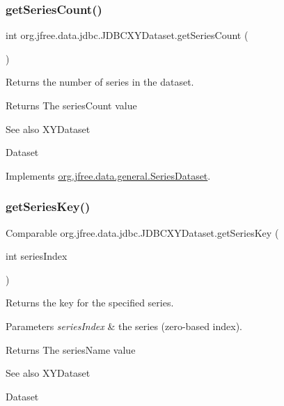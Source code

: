 \subsubsection{\texorpdfstring{get\+Series\+Count()}{getSeriesCount()}}
{\footnotesize\ttfamily int org.\+jfree.\+data.\+jdbc.\+J\+D\+B\+C\+X\+Y\+Dataset.\+get\+Series\+Count (\begin{DoxyParamCaption}{ }\end{DoxyParamCaption})}

Returns the number of series in the dataset.

\begin{DoxyReturn}{Returns}
The series\+Count value
\end{DoxyReturn}
\begin{DoxySeeAlso}{See also}
X\+Y\+Dataset 

Dataset 
\end{DoxySeeAlso}


Implements \mbox{\hyperlink{interfaceorg_1_1jfree_1_1data_1_1general_1_1_series_dataset_a84fe822f5918f941d9de1ed1b73c9f58}{org.\+jfree.\+data.\+general.\+Series\+Dataset}}.

\mbox{\label{classorg_1_1jfree_1_1data_1_1jdbc_1_1_j_d_b_c_x_y_dataset_a9e0357ec22ce7eeff36ff12c6cfd4d00}} 
\subsubsection{\texorpdfstring{get\+Series\+Key()}{getSeriesKey()}}
{\footnotesize\ttfamily Comparable org.\+jfree.\+data.\+jdbc.\+J\+D\+B\+C\+X\+Y\+Dataset.\+get\+Series\+Key (\begin{DoxyParamCaption}\item[{int}]{series\+Index }\end{DoxyParamCaption})}

Returns the key for the specified series.


\begin{DoxyParams}{Parameters}
{\em series\+Index} & the series (zero-\/based index).\\
\hline
\end{DoxyParams}
\begin{DoxyReturn}{Returns}
The series\+Name value
\end{DoxyReturn}
\begin{DoxySeeAlso}{See also}
X\+Y\+Dataset 

Dataset 
\end{DoxySeeAlso}


